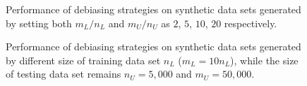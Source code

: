 \begin{figure}[!t]
  \centering
  \caption{\label{fig:mnratio}
  Performance of debiasing strategies on synthetic data sets 
  generated by setting both $m_L/n_L$ and $m_U/n_U$ as $2$, $5$, $10$, $20$ respectively.
  }
  \vspace{-0.1in}
\end{figure}

\begin{figure}[!t]
  \centering
  \caption{\label{fig:trainratio}
  Performance of debiasing strategies on synthetic data sets 
  generated by different size of training data set $n_L$ ($m_L=10n_L$), 
  while the size of testing data set remains $n_U=5,000$ and $m_U=50,000$.
  }
\end{figure}

